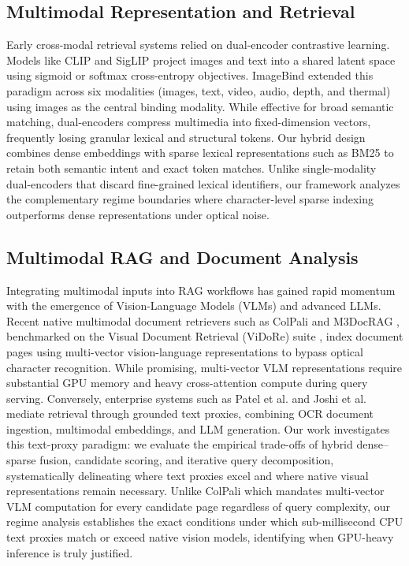 \documentclass[conference]{IEEEtran}
\begin{document}
\subsection{Multimodal Representation and Retrieval}
Early cross-modal retrieval systems relied on dual-encoder contrastive learning. Models like CLIP \cite{radford2021clip} and SigLIP \cite{zhai2023siglip} project images and text into a shared latent space using sigmoid or softmax cross-entropy objectives. ImageBind \cite{girdhar2023imagebind} extended this paradigm across six modalities (images, text, video, audio, depth, and thermal) using images as the central binding modality. While effective for broad semantic matching, dual-encoders compress multimedia into fixed-dimension vectors, frequently losing granular lexical and structural tokens. Our hybrid design combines dense embeddings with sparse lexical representations such as BM25 \cite{robertson2009bm25} to retain both semantic intent and exact token matches. Unlike single-modality dual-encoders that discard fine-grained lexical identifiers, our framework analyzes the complementary regime boundaries where character-level sparse indexing outperforms dense representations under optical noise.

\subsection{Multimodal RAG and Document Analysis}
Integrating multimodal inputs into RAG workflows has gained rapid momentum with the emergence of Vision-Language Models (VLMs) and advanced LLMs. Recent native multimodal document retrievers such as ColPali \cite{faysse2024colpali} and M3DocRAG \cite{cho2024m3docrag}, benchmarked on the Visual Document Retrieval (ViDoRe) suite \cite{faysse2024vidore}, index document pages using multi-vector vision-language representations to bypass optical character recognition. While promising, multi-vector VLM representations require substantial GPU memory and heavy cross-attention compute during query serving. Conversely, enterprise systems such as Patel et al. \cite{patel2025multimodal} and Joshi et al. \cite{joshi2024multimodel} mediate retrieval through grounded text proxies, combining OCR document ingestion, multimodal embeddings, and LLM generation. Our work investigates this text-proxy paradigm: we evaluate the empirical trade-offs of hybrid dense--sparse fusion, candidate scoring, and iterative query decomposition, systematically delineating where text proxies excel and where native visual representations remain necessary. Unlike ColPali \cite{faysse2024colpali} which mandates multi-vector VLM computation for every candidate page regardless of query complexity, our regime analysis establishes the exact conditions under which sub-millisecond CPU text proxies match or exceed native vision models, identifying when GPU-heavy inference is truly justified.
\end{document}
